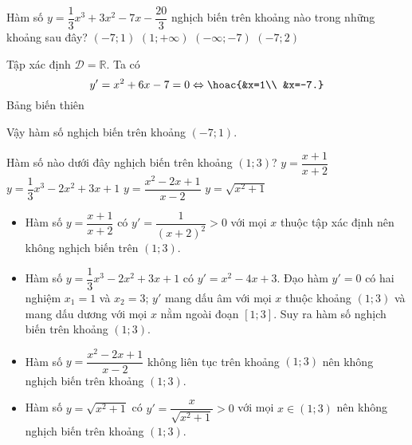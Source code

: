 \begin{ex}%
 Hàm số $y=\dfrac{1}{3}x^3+3x^2-7x-\dfrac{20}{3}$ nghịch biến trên khoảng nào trong những khoảng sau đây?
 \choice
  {\True $(-7;1)$}
  {$(1;+\infty)$}
  {$(-\infty;-7)$}
  {$(-7;2)$}
 \loigiai
  {
  Tập xác định $\mathscr{D}=\mathbb{R}$. Ta có
  \[y'=x^2+6x-7=0\Leftrightarrow \hoac{&x=1\\ &x=-7.}\]
  Bảng biến thiên
  \begin{center}
  \end{center}
  Vậy hàm số nghịch biến trên khoảng $(-7;1)$.
  }
\end{ex}

\begin{ex}%
 Hàm số nào dưới đây nghịch biến trên khoảng $(1;3)$?
 \choice
  {$y=\dfrac{x+1}{x+2}$}
  {\True $y=\dfrac{1}{3}x^3-2x^2+3x+1$}
  {$y=\dfrac{x^2-2x+1}{x-2}$}
  {$y=\sqrt{x^2+1}$}
 \loigiai
  {
  \begin{itemize}
   \item Hàm số $y=\dfrac{x+1}{x+2}$ có $y'=\dfrac{1}{(x+2)^2}>0$ với mọi $x$ thuộc tập xác định nên không nghịch biến trên $(1;3)$.
   \item Hàm số $y=\dfrac{1}{3}x^3-2x^2+3x+1$ có $y'=x^2-4x+3$. Đạo hàm $y'=0$ có hai nghiệm $x_1=1$ và $x_2=3$; $y'$ mang dấu âm với mọi $x$ thuộc khoảng $(1;3)$ và mang dấu dương với mọi $x$ nằm ngoài đoạn $[1;3]$. Suy ra hàm số nghịch biến trên khoảng $(1;3)$.
   \item Hàm số $y=\dfrac{x^2-2x+1}{x-2}$ không liên tục trên khoảng $(1;3)$ nên không nghịch biến trên khoảng $(1;3)$.
   \item Hàm số $y=\sqrt{x^2+1}$ có $y'=\dfrac{x}{\sqrt{x^2+1}}>0$ với mọi $x\in (1;3)$ nên không nghịch biến trên khoảng $(1;3)$.
  \end{itemize}
  }
\end{ex}


